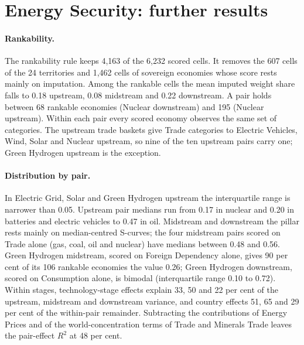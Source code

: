 \section{Energy Security: further results}\label{oa:es}

\paragraph{Rankability.} The rankability rule keeps 4{,}163 of the 6{,}232 scored cells. It removes
the 607 cells of the 24 territories and 1{,}462 cells of sovereign economies whose score rests
mainly on imputation. Among the rankable cells the mean imputed weight share falls to 0.18
upstream, 0.08 midstream and 0.22 downstream. A pair holds between 68 rankable economies (Nuclear
downstream) and 195 (Nuclear upstream). Within each pair every scored economy observes the same
set of categories. The upstream trade baskets give Trade categories to Electric Vehicles, Wind,
Solar and Nuclear upstream, so nine of the ten upstream pairs carry one; Green Hydrogen upstream is
the exception.

\paragraph{Distribution by pair.} In Electric Grid, Solar and Green Hydrogen upstream the
interquartile range is narrower than 0.05. Upstream pair medians run from 0.17 in nuclear and 0.20
in batteries and electric vehicles to 0.47 in oil. Midstream and downstream the pillar rests mainly
on median-centred S-curves; the four midstream pairs scored on Trade alone (gas, coal, oil and
nuclear) have medians between 0.48 and 0.56. Green Hydrogen midstream, scored on Foreign Dependency
alone, gives 90 per cent of its 106 rankable economies the value 0.26; Green Hydrogen downstream,
scored on Consumption alone, is bimodal (interquartile range 0.10 to 0.72). Within stages,
technology-stage effects explain 33, 50 and 22 per cent of the upstream, midstream and downstream
variance, and country effects 51, 65 and 29 per cent of the within-pair remainder. Subtracting
the contributions of Energy Prices and of the world-concentration terms of Trade and Minerals
Trade leaves the pair-effect $R^2$ at 48 per cent.

